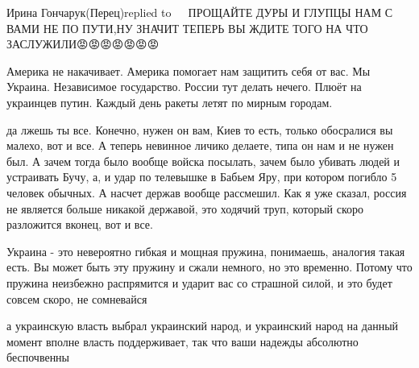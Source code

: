 Ирина Гончарук(Перец)replied to 🌺🥀🌹
ПРОЩАЙТЕ ДУРЫ И ГЛУПЦЫ НАМ С ВАМИ НЕ ПО ПУТИ,НУ ЗНАЧИТ ТЕПЕРЬ ВЫ ЖДИТЕ ТОГО НА ЧТО ЗАСЛУЖИЛИ😡😡😡😡😡😡😡

Америка не накачивает. Америка помогает нам защитить себя от вас. Мы Украина.
Независимое государство. России тут делать нечего. Плюёт на украинцев путин.
Каждый день ракеты летят по мирным городам.

да лжешь ты все. Конечно, нужен он вам, Киев то есть, только обосралися вы
малехо, вот и все. А теперь невинное личико делаете, типа он нам и не нужен
был. А зачем тогда было вообще войска посылать, зачем было убивать людей и
устраивать Бучу, а, и удар по телевышке в Бабьем Яру, при котором погибло 5
человек обычных. А насчет держав вообще рассмешил. Как я уже сказал, россия не
является больше никакой державой, это ходячий труп, который скоро разложится
вконец, вот и все.

Украина - это невероятно гибкая и мощная пружина, понимаешь, аналогия такая
есть. Вы может быть эту пружину и сжали немного, но это временно. Потому что
пружина неизбежно распрямится и ударит вас со страшной силой, и это будет
совсем скоро, не сомневайся

а украинскую власть выбрал украинский народ, и украинский народ на данный
момент вполне власть поддерживает, так что ваши надежды абсолютно беспочвенны

